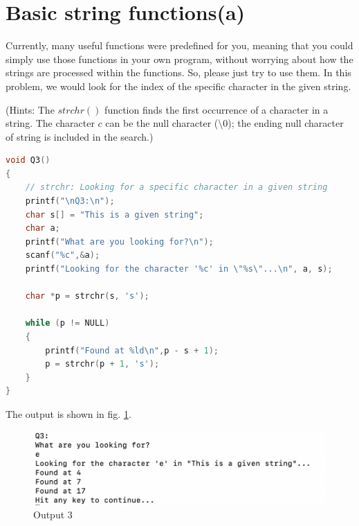 \documentclass[12pt]{article}
\begin{document}
\section{Basic string functions(a)}

Currently, many useful functions were predefined for you, meaning that you could simply use those functions in your own program, without worrying about how the strings are processed within the functions. So, please just try to use them. In this problem, we would look for the index of the specific character in the given string. 

(Hints: The $strchr()$ function finds the first occurrence of a character in a string. The character $c$ can be the null character ($\setminus0$); the ending null character of string is included in the search.) 

\begin{lstlisting}[language=C, caption=Solution 3]
void Q3()
{
    // strchr: Looking for a specific character in a given string
    printf("\nQ3:\n");
    char s[] = "This is a given string";
    char a;
    printf("What are you looking for?\n");
    scanf("%c",&a);
    printf("Looking for the character '%c' in \"%s\"...\n", a, s);
    
    char *p = strchr(s, 's');
    
    while (p != NULL) 
    {
        printf("Found at %ld\n",p - s + 1);
        p = strchr(p + 1, 's');
    }
}
\end{lstlisting}

The output is shown in fig. \ref{output3}.


\begin{figure}[h]
\includegraphics[scale=0.85]{Images/output3.png} 
\caption{Output 3}
\label{output3}
\end{figure}
\end{document}
